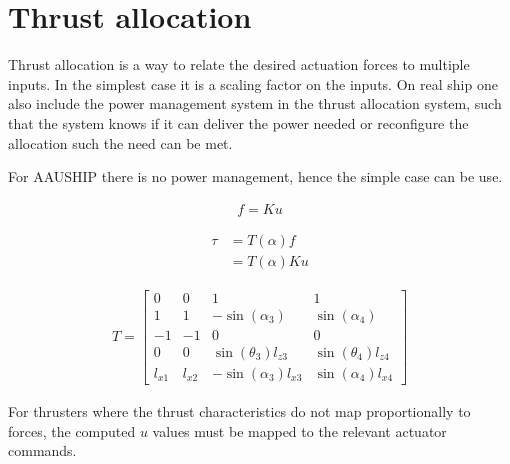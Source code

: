 \section{Thrust allocation}

Thrust allocation is a way to relate the desired actuation forces to multiple inputs. In the simplest case it is a scaling factor on the inputs. On real ship one also include the power management system in the thrust allocation system, such that the system knows if it can deliver the power needed or reconfigure the allocation such the need can be met.

For AAUSHIP there is no power management, hence the simple case can be use.

\begin{align}
f  = K u
\label{eq:fKu}
\end{align}

\begin{subequations}
\begin{align}
 \tau &=  T ( \alpha)  f\\
&=  T (  \alpha)  K  u
\end{align}
\end{subequations}

\begin{align}
T =
\begin{bmatrix}
0 & 0 & 1 & 1\\
1 & 1 & -\sin(\alpha_3) & \sin(\alpha_4)\\
-1 & -1 & 0 & 0\\
0 & 0 & \sin(\theta_3) l_{z3} & \sin(\theta_4)l_{z4} \\
l_{x1} & l_{x2} & -\sin(\alpha_3) l_{x3} & \sin(\alpha_4) l_{x4}
\end{bmatrix}
\end{align}
\citep{mss}


For thrusters where the thrust characteristics do not map
proportionally to forces, the computed $u$ values must be mapped
to the relevant actuator commands.

